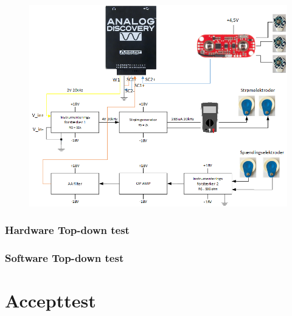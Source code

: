 \begin{figure}[H] 
\centering
{\includegraphics[width=\linewidth]
{Figure/integrationstestDiagram}}
\caption{}
\label{fig:integrationstestDiagram}
\end{figure}


\subsection{Hardware Top-down test}







\subsection{Software Top-down test}










\chapter{Accepttest}






\citep{Aroom2009}


